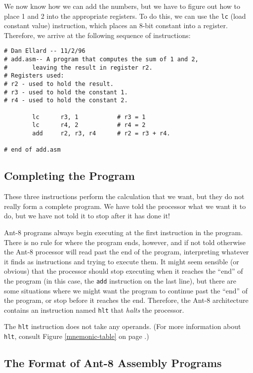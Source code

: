We now know how we can add the numbers, but we have to figure out how
to place 1 and 2 into the appropriate registers.  To do this, we can
use the {\tt lc} (load constant value) instruction, which places an
8-bit constant into a register.  Therefore, we arrive at the following
sequence of instructions:

{\codesize
\begin{verbatim}
# Dan Ellard -- 11/2/96
# add.asm-- A program that computes the sum of 1 and 2,
#       leaving the result in register r2.
# Registers used:
# r2 - used to hold the result.
# r3 - used to hold the constant 1.
# r4 - used to hold the constant 2.

        lc      r3, 1           # r3 = 1
        lc      r4, 2           # r4 = 2
        add     r2, r3, r4      # r2 = r3 + r4.

# end of add.asm
\end{verbatim}}

\subsection{Completing the Program}

These three instructions perform the calculation that we want, but
they do not really form a complete program.  We have told the
processor what we want it to do, but we have not told it to stop
after it has done it!

{\sc Ant-8} programs always begin executing at the first instruction in
the program.  There is no rule for where the program ends, however,
and if not told otherwise the {\sc Ant-8} processor will read past the
end of the program, interpreting whatever it finds as instructions and
trying to execute them.  It might seem sensible (or obvious) that the
processor should stop executing when it reaches the ``end'' of the
program (in this case, the {\tt add} instruction on the last line), but
there are some situations where we might want the program to continue
past the ``end'' of the program, or stop before it reaches the end.
Therefore, the {\sc Ant-8} architecture contains an instruction named
{\tt hlt} that {\em halts} the processor.

The {\tt hlt} instruction does not take any operands.
(For more information about {\tt hlt}, consult Figure
\ref{mnemonic-table} on page \pageref{mnemonic-table}.)



\subsection{The Format of {\sc Ant-8} Assembly Programs}

